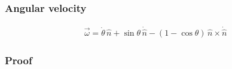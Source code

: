 \documentclass[letterpaper,10pt,english]{jupyterBook}
\begin{document}
\subsubsection{Angular velocity}
\label{\detokenize{ch/kinematics-rotations-param-axis-angle:angular-velocity}}\label{\detokenize{ch/kinematics-rotations-param-axis-angle:classical-mechanics-kinematics-rotations-axis-angle-angular-velocity}}\begin{equation*}
\begin{split}
  \vec{\omega} = \dot{\theta} \,  \hat{n} + \sin \theta \, \dot{\hat{n}} - \left( 1 - \cos \theta \right) \,  \hat{n}\times \dot{\hat{n}}
\end{split}
\end{equation*}\subsubsection*{Proof}
\end{document}
